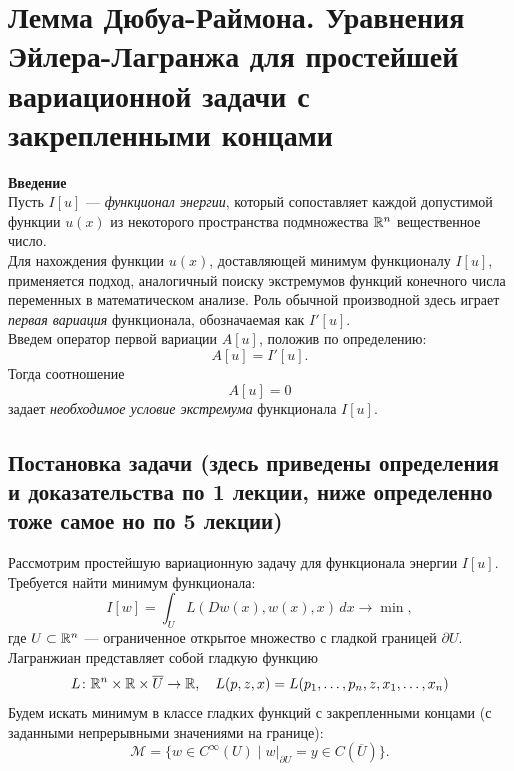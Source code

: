 \section{Лемма Дюбуа-Раймона. Уравнения Эйлера-Лагранжа для простейшей
вариационной задачи с закрепленными концами}
\textbf{Введение}\\
Пусть $I[u]$ --- \textit{функционал энергии}, который сопоставляет каждой 
допустимой функции $u(x)$ из некоторого пространства подмножества $\mathbb{R}^n$
вещественное число. \\
Для нахождения функции $u(x)$, доставляющей минимум функционалу $I[u]$,
применяется подход, аналогичный поиску экстремумов функций конечного числа
переменных в математическом анализе. Роль обычной производной здесь играет
\textit{первая вариация} функционала,
обозначаемая как $I'[u]$.\\
Введем оператор первой вариации $A[u]$, положив по определению:
\begin{equation}
    A[u] = I'[u].
\end{equation}
Тогда соотношение
\begin{equation}
    A[u] = 0 
\end{equation}
задает \textit{необходимое условие экстремума} функционала $I[u]$.\\

\subsection{Постановка задачи (здесь приведены определения и доказательства по 1 лекции, ниже определенно тоже самое но по 5 лекции)}
Рассмотрим простейшую вариационную задачу для функционала энергии $I[u]$. 
Требуется найти минимум функционала:
\begin{equation}
    I[w] = \int_U L(Dw(x), w(x), x) \, dx \rightarrow \min,
\end{equation}
где $U \subset \mathbb{R}^n$ --- ограниченное открытое множество с гладкой границей
$\partial U$. \\
Лагранжиан представляет собой гладкую функцию 
$$L \colon \mathbb{R}^n \times \mathbb{R} \times \overline{U} \to \mathbb{R}, \quad
L(p, z, x) = L(p_1, \dots, p_n, z, x_1, \dots, x_n)$$
Будем искать минимум в классе гладких функций
с закрепленными концами (с заданными непрерывными значениями на границе):
\begin{equation}
    \mathcal{M} = \{ w \in C^\infty(U) \mid w|_{\partial U} = y \in C(\overline{U}) \}.
\end{equation}

